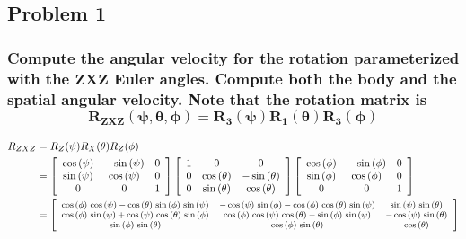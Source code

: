 \documentclass[12pt, letterpaper]{../assignment}
\begin{document}
\subsection*{Problem 1}
\subsubsection*{Compute the angular velocity for the rotation parameterized with the $\bm{ZXZ}$ Euler angles.
Compute both the body and the spatial angular velocity. Note that the rotation matrix is
$$ \bm{ R_{ZXZ}(\psi,\theta,\phi) = R_3(\psi) R_1(\theta) R_3(\phi) } $$}


\begin{equation*}
  \begin{aligned}
    R_{ZXZ} &= R_{Z}(\psi) R_{X}(\theta) R_{Z}(\phi) \\
    &= \left[\begin{array}{ccc} \cos\left(\psi \right) & -\sin\left(\psi \right) & 0\\ \sin\left(\psi \right) & \cos\left(\psi \right) & 0\\ 0 & 0 & 1 \end{array}\right]
    \left[\begin{array}{ccc} 1 & 0 & 0\\ 0 & \cos\left(\theta \right) & -\sin\left(\theta \right)\\ 0 & \sin\left(\theta \right) & \cos\left(\theta \right) \end{array}\right]
    \left[\begin{array}{ccc} \cos\left(\phi \right) & -\sin\left(\phi \right) & 0\\ \sin\left(\phi \right) & \cos\left(\phi \right) & 0\\ 0 & 0 & 1 \end{array}\right]\\
    &= \footnotesize{\left[\begin{array}{ccc}
            \cos \left(\phi \right)\,\cos \left(\psi \right)-\cos \left(\theta \right)\,\sin \left(\phi \right)\,\sin \left(\psi \right) & -\cos \left(\psi \right)\,\sin \left(\phi \right)-\cos \left(\phi \right)\,\cos \left(\theta \right)\,\sin \left(\psi \right) & \sin \left(\psi \right)\,\sin \left(\theta \right)\\
            \cos \left(\phi \right)\,\sin \left(\psi \right)+\cos \left(\psi \right)\,\cos \left(\theta \right)\,\sin \left(\phi \right) & \cos \left(\phi \right)\,\cos \left(\psi \right)\,\cos \left(\theta \right)-\sin \left(\phi \right)\,\sin \left(\psi \right) & -\cos \left(\psi \right)\,\sin \left(\theta \right)\\
            \sin \left(\phi \right)\,\sin \left(\theta \right) & \cos \left(\phi \right)\,\sin \left(\theta \right) & \cos \left(\theta \right)
            \end{array}\right]}
  \end{aligned}
\end{equation*}
\end{document}

